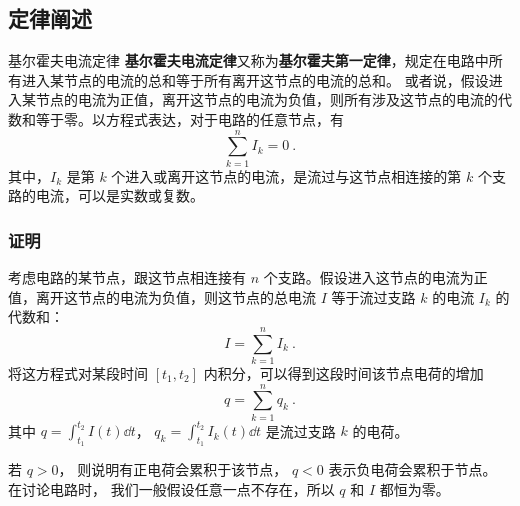 

\subsection{定律阐述}
\begin{theorem}{基尔霍夫电流定律}
\textbf{基尔霍夫电流定律}又称为\textbf{基尔霍夫第一定律}，规定在电路中所有进入某节点的电流的总和等于所有离开这节点的电流的总和。 或者说，假设进入某节点的电流为正值，离开这节点的电流为负值，则所有涉及这节点的电流的代数和等于零。以方程式表达，对于电路的任意节点，有
\begin{equation}
\sum_{k=1}^n I_k =0~.
\end{equation}
其中，$I_k$ 是第 $k$ 个进入或离开这节点的电流，是流过与这节点相连接的第 $k$ 个支路的电流，可以是实数或复数。
\end{theorem}

\subsubsection{证明}
考虑电路的某节点，跟这节点相连接有 $n$ 个支路。假设进入这节点的电流为正值，离开这节点的电流为负值，则这节点的总电流 $I$ 等于流过支路 $k$ 的电流 $I_k$ 的代数和：
\begin{equation}
I=\sum_{k=1}^n I_k~.
\end{equation}
将这方程式对某段时间 $[t_1, t_2]$ 内积分，可以得到这段时间该节点电荷的增加
\begin{equation}
q=\sum_{k=1}^n q_k~.
\end{equation}
其中 $q = \int_{t_1}^{t_2} I(t) \dd{t}$， $q_k=\int_{t_1}^{t_2} I_k(t) \dd{t}$ 是流过支路 $k$ 的电荷。

若 $q>0$， 则说明有正电荷会累积于该节点， $q < 0$ 表示负电荷会累积于节点。 在讨论电路时， 我们一般假设任意一点不存在，所以 $q$ 和 $I$ 都恒为零。

